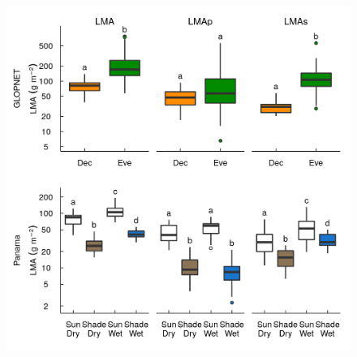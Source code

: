 \documentclass[
  12pt,
  a4paper,
,tablecaptionabove
]{scrartcl}
\providecommand{\DIFaddbeginFL}{} %
\providecommand{\DIFdelbeginFL}{} %
\providecommand{\DIFdelendFL}{} %
\newcommand{\DIFscaledelfig}{0.5}
\newlength{\DIFdelgraphicswidth} %
\newlength{\DIFdelgraphicsheight} %
\newcommand{\DIFaddincludegraphics}[2][]{{\color{blue}\fbox{\DIFOincludegraphics[#1]{#2}}}} %
\newcommand{\DIFdelincludegraphics}[2][]{%
\sbox{\DIFdelgraphicsbox}{\DIFOincludegraphics[#1]{#2}}%
\settoboxwidth{\DIFdelgraphicswidth}{\DIFdelgraphicsbox} %
\settoboxtotalheight{\DIFdelgraphicsheight}{\DIFdelgraphicsbox} %
\scalebox{\DIFscaledelfig}{%
\parbox[b]{\DIFdelgraphicswidth}{\usebox{\DIFdelgraphicsbox}\\[-\baselineskip] \rule{\DIFdelgraphicswidth}{0em}}\llap{\resizebox{\DIFdelgraphicswidth}{\DIFdelgraphicsheight}{%
\setlength{\unitlength}{\DIFdelgraphicswidth}%
\begin{picture}(1,1)%
\thicklines\linethickness{2pt} %
{\color[rgb]{1,0,0}\put(0,0){\framebox(1,1){}}}%
{\color[rgb]{1,0,0}\put(0,0){\line( 1,1){1}}}%
{\color[rgb]{1,0,0}\put(0,1){\line(1,-1){1}}}%
\end{picture}%
}\hspace*{3pt}}} %
} %
\DeclareRobustCommand{\DIFaddbeginFL}{\DIFOaddbeginFL \let\includegraphics\DIFaddincludegraphics} %
\DeclareRobustCommand{\DIFdelbeginFL}{\DIFOdelbeginFL \let\includegraphics\DIFdelincludegraphics} %
\DeclareRobustCommand{\DIFdelendFL}{\DIFOaddendFL \let\includegraphics\DIFOincludegraphics} %
\begin{document}
\begin{figure}
\DIFdelbeginFL %
\DIFdelendFL \DIFaddbeginFL

{\centering \includegraphics{../figs/box_main.png}

}
\end{figure}
\end{document}
